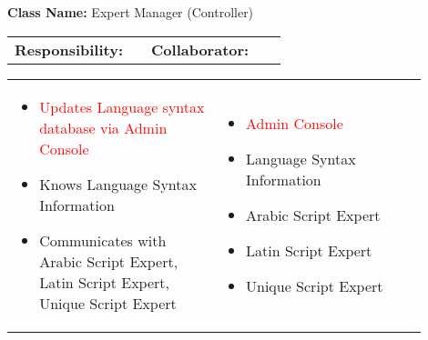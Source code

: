 \begin{cards}[]
    \textbf{Class Name:} Expert Manager (Controller)
    \tcbline
    \begin{tabular}{p{0.45\linewidth} | p{0.45\linewidth}}
        \textbf{Responsibility:}& 
        \textbf{Collaborator:}\\
    \end{tabular}
    \tcbline
    \begin{tabular}{p{0.45\linewidth} | p{0.45\linewidth}}
        \begin{itemize}
            \item \textcolor{red}{Updates Language syntax database via Admin Console}
            \item Knows Language Syntax Information
            \item Communicates with Arabic Script Expert, Latin Script Expert, Unique Script Expert
            
        \end{itemize}
        &
        \begin{itemize}
            \item \textcolor{red}{Admin Console}
            \item Language Syntax Information
            \item Arabic Script Expert
            \item Latin Script Expert
            \item Unique Script Expert
            
        \end{itemize}
    \end{tabular}
\end{cards}